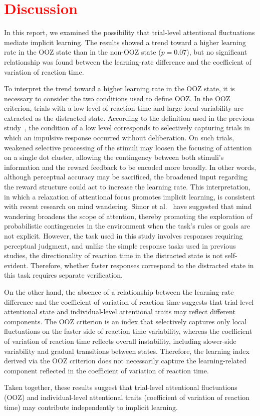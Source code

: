 \documentclass[dvipdfmx]{article}
\begin{document}
\section{\textcolor{red}{Discussion}}
In this report, we examined the possibility that trial-level attentional fluctuations mediate implicit learning.
The results showed a trend toward a higher learning rate in the OOZ state than in the non-OOZ state ($p = 0.07$), but no significant relationship was found between the learning-rate difference and the coefficient of variation of reaction time.

To interpret the trend toward a higher learning rate in the OOZ state, it is necessary to consider the two conditions used to define OOZ.
In the OOZ criterion, trials with a low level of reaction time and large local variability are extracted as the distracted state.
According to the definition used in the previous study~\cite{decker2023pay}, the condition of a low level corresponds to selectively capturing trials in which an impulsive response occurred without deliberation.
On such trials, weakened selective processing of the stimuli may loosen the focusing of attention on a single dot cluster, allowing the contingency between both stimuli's information and the reward feedback to be encoded more broadly.
In other words, although perceptual accuracy may be sacrificed, the broadened input regarding the reward structure could act to increase the learning rate.
This interpretation, in which a relaxation of attentional focus promotes implicit learning, is consistent with recent research on mind wandering.
Simor et al.~\cite{simor2025mind} have suggested that mind wandering broadens the scope of attention, thereby promoting the exploration of probabilistic contingencies in the environment when the task's rules or goals are not explicit.
However, the task used in this study involves responses requiring perceptual judgment, and unlike the simple response tasks used in previous studies, the directionality of reaction time in the distracted state is not self-evident.
Therefore, whether faster responses correspond to the distracted state in this task requires separate verification.

On the other hand, the absence of a relationship between the learning-rate difference and the coefficient of variation of reaction time suggests that trial-level attentional state and individual-level attentional traits may reflect different components.
The OOZ criterion is an index that selectively captures only local fluctuations on the faster side of reaction time variability, whereas the coefficient of variation of reaction time reflects overall instability, including slower-side variability and gradual transitions between states.
Therefore, the learning index derived via the OOZ criterion does not necessarily capture the learning-related component reflected in the coefficient of variation of reaction time.

Taken together, these results suggest that trial-level attentional fluctuations (OOZ) and individual-level attentional traits (coefficient of variation of reaction time) may contribute independently to implicit learning.


\clearpage


\end{document}
